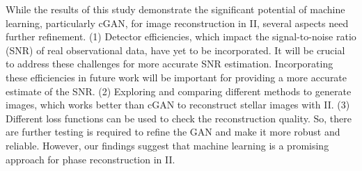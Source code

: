While the results of this study demonstrate the significant potential of machine learning, particularly cGAN, for image reconstruction in II, several aspects need further refinement. (1) Detector efficiencies, which impact the signal-to-noise ratio (SNR) of real observational data, have yet to be incorporated. It will be crucial to address these challenges for more accurate SNR estimation. Incorporating these efficiencies in future work will be important for providing a more accurate estimate of the SNR. (2) Exploring and comparing different methods to generate images, which works better than cGAN to reconstruct stellar images with II. (3) Different loss functions can be used to check the reconstruction quality. So, there are further testing is required to refine the GAN and make it more robust and reliable. However, our findings suggest that machine learning is a promising approach for phase reconstruction in II.